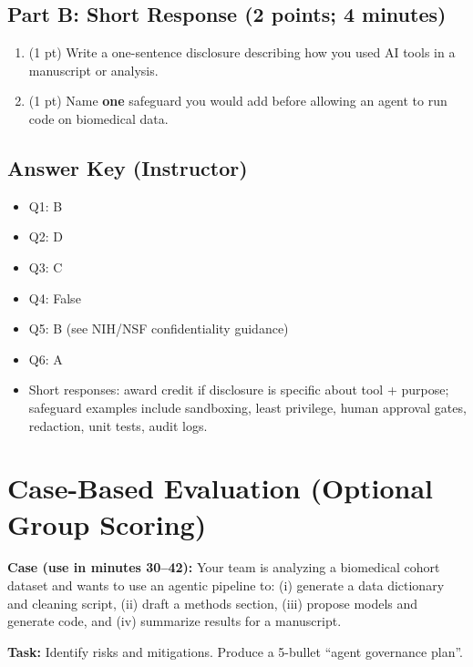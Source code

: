 \documentclass[11pt]{article}
\begin{document}
\subsection{Part B: Short Response (2 points; 4 minutes)}
\begin{enumerate}[leftmargin=*, resume]
\item (1 pt) Write a one-sentence disclosure describing how you used AI tools in a manuscript or analysis.
\item (1 pt) Name \textbf{one} safeguard you would add before allowing an agent to run code on biomedical data.
\end{enumerate}

\subsection{Answer Key (Instructor)}
\begin{itemize}
\item Q1: B
\item Q2: D
\item Q3: C
\item Q4: False
\item Q5: B (see NIH/NSF confidentiality guidance)
\item Q6: A
\item Short responses: award credit if disclosure is specific about tool + purpose; safeguard examples include sandboxing, least privilege, human approval gates, redaction, unit tests, audit logs.
\end{itemize}

\section{Case-Based Evaluation (Optional Group Scoring)}
\label{sec:case}
\textbf{Case (use in minutes 30--42):} Your team is analyzing a biomedical cohort dataset and wants to use an agentic pipeline to:
(i) generate a data dictionary and cleaning script, (ii) draft a methods section, (iii) propose models and generate code, and (iv) summarize results for a manuscript.

\textbf{Task:} Identify risks and mitigations. Produce a 5-bullet ``agent governance plan''.
\end{document}

